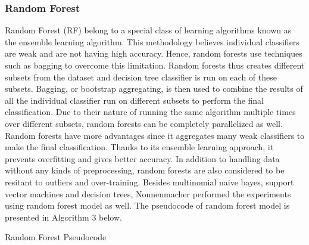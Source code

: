 \documentclass[a4paper,12pt,twoside]{report}
\begin{document}
\subsubsection{Random Forest}
Random Forest (\acs{RF}) belong to a special class of learning algorithms known as the ensemble learning algorithm. This methodology believes individual classifiers are weak and are not having high accuracy. Hence, random forests use techniques such as bagging to overcome this limitation. Random forests thus creates different subsets from the dataset and decision tree classifier is run on each of these subsets. Bagging, or bootstrap aggregating, is then used to combine the results of all the individual classifier run on different subsets to perform the final classification\cite{Jain2017}. 
\newline \newline
Due to their nature of running the same algorithm multiple times over different subsets, random forests can be completely parallelized as well. Random forests have more advantages since it aggregates many weak classifiers to make the final classification. Thanks to its ensemble learning approach, it prevents overfitting and gives better accuracy. In addition to handling data without any kinds of preprocessing, random forests are also considered to be resitant to outliers and over-training\cite{Jain2017}. 
\newline \newline
Besides multinomial naive bayes, support vector machines and decision trees, Nonnenmacher\cite{Nonnenmacher2017} performed the experiments using random forest model as well. The pseudocode of random forest model is presented in Algorithm 3 below. 
\begin{algorithm}
\caption{Random Forest Pseudocode}
\begin{algorithmic}[1]
\State {}
	\State {}
	\State {}
   	\State {}
\EndFor
\State {}
\State {}
\EndProcedure
\end{algorithmic}
\end{algorithm}
\end{document}
